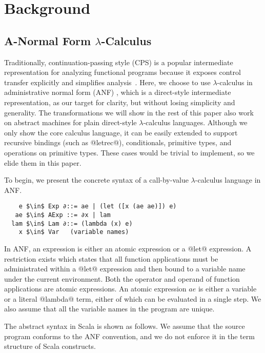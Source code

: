 \documentclass[acmsmall]{acmart}\settopmatter{}
\begin{document}
\section{Background} \label{background}

\subsection{A-Normal Form $\lambda$-Calculus} \label{anfsyntax}

Traditionally, continuation-passing style (CPS) is a popular intermediate representation
for analyzing functional programs because it exposes control transfer explicitly and 
simplifies analysis~\cite{Shivers:1991:SSC:115865.115884, Shivers:1988:CFA:53990.54007}.
Here, we choose to use $\lambda$-calculus in administrative normal form (ANF)
\cite{flanagan1993essence}, which is a direct-style intermediate representation, as our 
target for clarity, but without losing simplicity and generality. The transformations 
we will show in the rest of this paper also work on abstract machines for plain 
direct-style $\lambda$-calculus languages. Although we only show the core calculus language,
it can be easily extended to support recursive bindings (such as @letrec@), conditionals, 
primitive types, and operations on primitive types. These cases would be trivial to implement,
so we elide them in this paper.

To begin, we present the concrete syntax of a call-by-value $\lambda$-calculus language
in ANF.

\begin{lstlisting}
    e $\in$ Exp ∂::= ae | (let ([x (ae ae)]) e)
   ae $\in$ AExp ::= ∂x | lam
  lam $\in$ Lam ∂::= (lambda (x) e)
    x $\in$ Var   (variable names)
\end{lstlisting}

In ANF, an expression is either an atomic expression or a @let@ expression.
A restriction exists which states that all function applications must be administrated
within a @let@ expression and then bound to a variable name under the current environment.
Both the operator and operand of function applications are atomic expressions.
An atomic expression $ae$ is either a variable or a literal @lambda@ term, either of which
can be evaluated in a single step. We also assume that all the variable names in the program
 are unique.

The abstract syntax in Scala is shown as follows. We assume that the source program conforms
to the ANF convention, and we do not enforce it in the term structure of Scala constructs.
\end{document}

